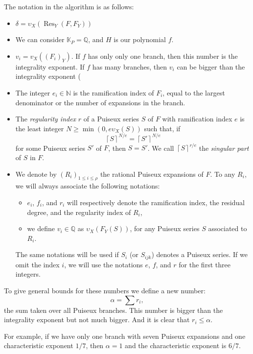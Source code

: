 \documentclass[a4paper,11pt,reqno]{amsart}%
\theoremstyle{definition}
\theoremstyle{plain}
\theoremstyle{remark}
\begin{document}
The notation in the algorithm is as follows:
\begin{itemize}
\item $\delta = \upsilon_X \left( \operatorname{Res}_Y(F, F_Y) \right)$
\item We can consider $\mathbb{K}_P = \mathbb{Q}$, and $H$ is our polynomial $f$.
\item $v_i = v_X({(F_i)}_Y)$. If $f$ has only only one branch, then this number is the integrality exponent. If $f$ has many branches, then $v_i$ can be bigger than the integrality exponent (
\item The integer $e_i \in\mathbb{N}$ is the ramification index of $F_i$, equal to the largest denominator or the number of expansions in the branch.
\item The \emph{regularity index} \( r \) of a Puiseux series \( S \) of \( F \) with ramification index \( e \) is the least integer \( N \ge \min(0, e \upsilon_X(S)) \) such that, if
\[
\left\lceil S \right\rceil^{N/e} = \left\lceil S' \right\rceil^{N/e}
\]
for some Puiseux series \( S' \) of \( F \), then \( S = S' \). We call \( \left\lceil S \right\rceil^{r/e} \) the \emph{singular part} of \( S \) in \( F \).

\item We denote by \( (R_i)_{1 \le i \le \rho} \) the rational Puiseux expansions of \( F \). To any \( R_i \), we will always associate the following notations:
\begin{itemize}
    \item \( e_i \), \( f_i \), and \( r_i \) will respectively denote the ramification index, the residual degree, and the regularity index of \( R_i \),
    \item we define \( v_i \in \mathbb{Q} \) as \( \upsilon_X(F_Y(S)) \), for any Puiseux series \( S \) associated to \( R_i \).
\end{itemize}
The same notations will be used if \( S_i \) (or \( S_{ijk} \)) denotes a Puiseux series. If we omit the index \( i \), we will use the notations \( e \), \( f \), and \( r \) for the first three integers.

\end{itemize}

To give general bounds for these numbers we define a new number:
$$
\alpha = \sum r_i,
$$
the sum taken over all Puiseux branches. This number is bigger than the integrality exponent but not much bigger. And it is clear that $r_i \le \alpha$.

For example, if we have only one branch with seven Puiseux expansions and one characteristic exponent $1/7$, then $\alpha = 1$ and the characteristic exponent is $6/7$.
\end{document}
